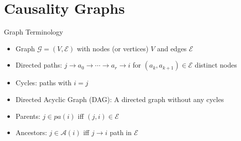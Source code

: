 \documentclass{beamer} %
\def\gcg{\mathcal{G}}  %
\def\gcge{\mathcal{E}}  %
\newcommand{\pa}[1]{pa(#1)}  %
\newcommand{\anc}[1]{\mathcal{A}(#1)}  %
\begin{document}
\section{Causality Graphs}
\begin{frame}{Graph Terminology}
  \begin{itemize}
    \item{Graph $\gcg = (V, \gcge)$ with nodes (or vertices) $V$ and edges $\gcge$}\pause
    \item{Directed paths: $j \rightarrow a_0 \rightarrow \cdots \rightarrow a_r \rightarrow i$ for $(a_{k}, a_{k + 1}) \in \gcge$ distinct nodes}\pause
    \item{Cycles: paths with $i = j$}
    \item{Directed Acyclic Graph (DAG): A directed graph without any cycles}\pause
    \item{Parents: $j \in \pa{i}$ iff $(j, i) \in \gcge$}\pause
    \item{Ancestors: $j \in \anc{i}$ iff $j \rightarrow i$ path in $\gcge$}
  \end{itemize}
\end{frame}
\end{document}
